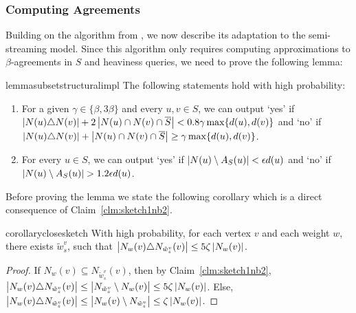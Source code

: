 \documentclass{article}
\begin{document}
\newcommand{\vagagr}{\abs{N(u)\cap N(v)} +
\abs{N(u)\triangle N(v)}- \abs{N(u)\cap N(v)\cap S}}


\subsubsection{Computing Agreements}\label{section:semi_agreement_cc}

Building on the algorithm from , we now describe its adaptation to the semi-streaming model. Since this algorithm only requires computing approximations to $\beta$-agreements in $S$ and heaviness queries, we need to prove the following lemma:
\begin{restatable}{lemma}{subsetstructuralimpl}\label{lemma:subset_structural_impl}
The following statements hold with high probability:

\begin{enumerate}
    \item For a given $\gamma \in \{\beta, 3\beta\}$ and every $u,v \in S$, we can output `yes' if $\left|N(u)\triangle N(v)\right| + 2\left|N(u)\cap N(v)\cap \overline{S}\right| < 0.8\gamma \max\{d(u), d(v)\}$ and `no' if $\left|N(u)\triangle N(v)\right| + \left|N(u)\cap N(v)\cap \overline{S}\right| \geq \gamma \max\{d(u), d(v)\}$.
    \item For every $u \in S$, we can output `yes' if $\left|N(u) \setminus A_S(u)\right| < \epsilon d(u)$ and `no' if $\left|N(u) \setminus A_S(u)\right| > 1.2 \epsilon d(u)$.
\end{enumerate}
\end{restatable}

Before proving the lemma we state the following corollary which is a direct consequence of Claim~\ref{clm:sketch1nb2}.

\begin{restatable}{corollary}{closesketch}\label{coro:closesketch}
With high probability, for each vertex \(v\) and each weight $w$, there exists $\tilde{w}^v_s$, such that $\left|N_w(v) \triangle N_{\tilde{w}^v_s}(v)\right| \leq 5\zeta \left|N_w(v)\right|$.
\end{restatable}

\begin{proof}
If $N_w(v) \subseteq  N_{\tilde{w}^v_s}(v)$, then by Claim~\ref{clm:sketch1nb2},
$\left|N_w(v) \triangle N_{\tilde{w}^v_s}(v)\right| \leq \left|N_{\tilde{w}^v_s} \setminus  N_w(v)\right| \leq 5\zeta \left| N_w(v)\right|$. Else, $\left|N_w(v) \triangle N_{\tilde{w}^v_s}(v)\right| \leq \left|N_w(v) \setminus N_{\tilde{w}^v_s}\right| \leq \zeta \left|N_w(v)\right|$. 
\end{proof}
\end{document}
